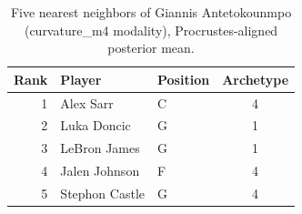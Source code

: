 \begin{table}[htbp]
  \centering\small
  \begin{tabular}{rllc}
    \toprule
    Rank & Player & Position & Archetype \\
    \midrule
    1 & Alex Sarr & C & 4 \\
    2 & Luka Doncic & G & 1 \\
    3 & LeBron James & G & 1 \\
    4 & Jalen Johnson & F & 4 \\
    5 & Stephon Castle & G & 4 \\
    \bottomrule
  \end{tabular}
  \caption{Five nearest neighbors of Giannis Antetokounmpo (curvature_m4 modality), Procrustes-aligned posterior mean.}
  \label{tab:Giannis_Antetokounmpo_neighbors_curvature_m4}
\end{table}

